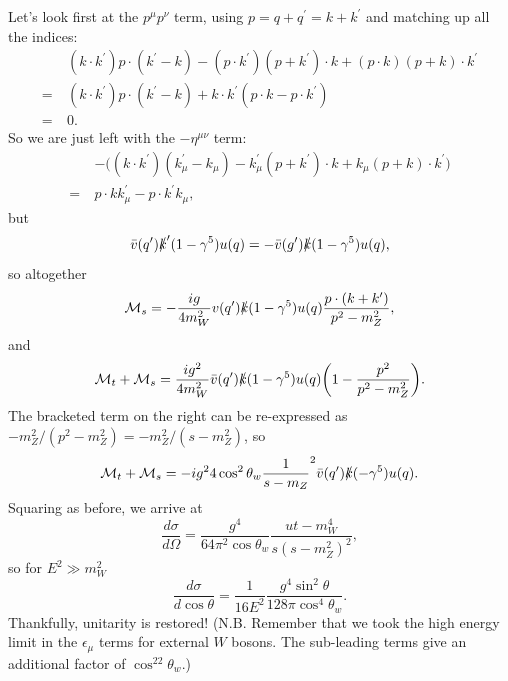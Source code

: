 \documentclass[a4paper,12pt]{article}
\begin{document}
Let's look first at the $p^\mu p ^\nu$ term, using $p=q+q^\prime = k + k^\prime$ and matching up all the indices:
\begin{equation}
\begin{split}
&(k \cdot k^\prime) p \cdot(k^\prime - k) - (p \cdot k^\prime)(p+k^\prime)\cdot k + (p \cdot k)(p+k) \cdot k^\prime \\
=\ &(k \cdot k^\prime)p\cdot(k^\prime-k) + k\cdot k^\prime (p\cdot k - p \cdot k^\prime) \\
=\ &0.
\end{split}
\end{equation}
So we are just left with the $-\eta^{\mu \nu}$ term:
\begin{equation}
\begin{split}
&- \big( (k \cdot k^\prime)(k^\prime_\mu - k_\mu) - k_\mu^\prime (p+k^\prime)\cdot k + k_\mu (p+k)\cdot k^\prime \big) \\
=\ &p \cdot k k^\prime_\mu - p \cdot k^\prime k_\mu,
\end{split}
\end{equation}
but 
\begin{equation}
\bar{v}(q^\prime)\slashed{k}^\prime(1-\gamma^5)u(q) = -\bar{v}(g^\prime)\slashed{k}(1-\gamma^5)u(q),
\end{equation}
so altogether
\begin{equation}
\mathcal{M}_s = -\frac{ig}{4m_W^2}v(q^\prime)\slashed{k}(1-\gamma^5)u(q) \frac{p \cdot (k + k^\prime)}{p^2-m_Z^2},
\end{equation}
and
\begin{equation}
\begin{split}
\mathcal{M}_t + \mathcal{M}_s = \frac{ig^2}{4m_W^2}\bar{v}(q^\prime)\slashed{k}(1-\gamma^5)u(q)\bigg(1-\frac{p^2}{p^2-m_Z^2}\bigg).
\end{split}
\end{equation}
The bracketed term on the right can be re-expressed as $-m_Z^2/(p^2-m_Z^2) = -m_Z^2/(s-m_Z^2)$, so 
\begin{equation}
\mathcal{M}_t + \mathcal{M}_s = -{ig^2}{4\cos^2\theta_w}\frac{1}{s-m_Z}^2\bar{v}(q^\prime)\slashed{k}(-\gamma^5)u(q).
\end{equation}
Squaring as before, we arrive at
\begin{equation}
\frac{d\sigma}{d\Omega} = \frac{g^4}{64\pi^2\cos\theta_w}\frac{ut-m_W^4}{s(s-m_Z^2)^2},
\end{equation}
so for $E^2 \gg m_W^2$
\begin{equation}
\frac{d\sigma}{d\cos\theta} = \frac{1}{16E^2}\frac{g^4\sin^2\theta}{128\pi\cos^4\theta_w}.
\end{equation}
Thankfully, unitarity is restored! (N.B. Remember that we took the high energy limit in the $\epsilon_\mu$ terms for external $W$ bosons. The sub-leading terms give an additional factor of $\cos^22\theta_w$.) 
\end{document}
